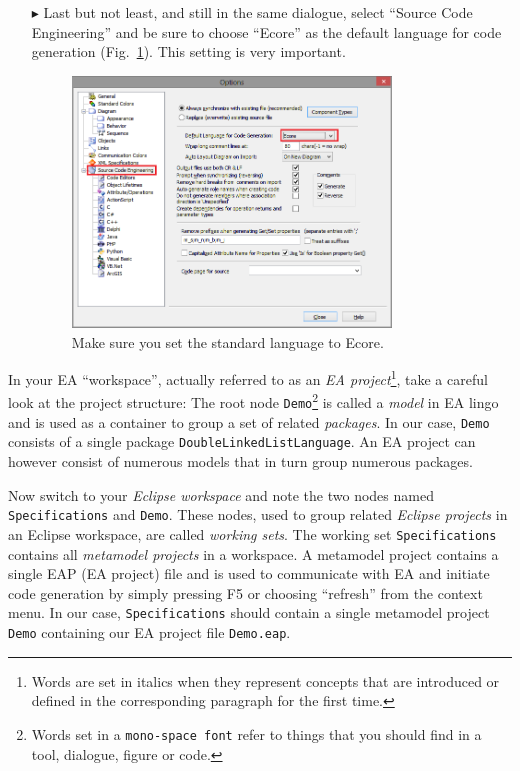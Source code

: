 \begin{itemize}
\item[$\blacktriangleright$] Last but not least, and still in the same dialogue, select ``Source Code Engineering'' and be sure to choose ``Ecore'' as the default language for code generation (Fig.~\ref{fig_standardSCEEA}). 
This setting is very important.
\begin{figure}
  \centering
  \includegraphics[width=0.8\textwidth]{../installation_images/standardCodeEngineering}
  \caption{Make sure you set the standard language to Ecore.}
  \label{fig_standardSCEEA}
\end{figure}
\end{itemize}

In your EA ``workspace'', actually referred to as an \emph{EA project}\footnote{Words are set in italics when they represent concepts that are introduced or defined  in the corresponding paragraph for the first time.}, take a careful  look at the project structure:  The root node \texttt{Demo}\footnote{Words set  in a \texttt{mono-space font} refer to things that you should find in a tool,  dialogue, figure or code.} is called a \emph{model} in EA lingo and is used as a  container to group a set of related \emph{packages}. 
In our case, \texttt{Demo}  consists of a single package \texttt{DoubleLinkedListLanguage}.
An EA project can however consist of numerous models that in turn group  numerous packages.

Now switch to your \emph{Eclipse workspace} and note the two nodes named \texttt{Spe\-ci\-fi\-ca\-tions} and \texttt{Demo}.  These nodes, used to group related \emph{Eclipse projects} in an Eclipse workspace, are called \emph{working sets}.
The working set \texttt{Spe\-ci\-fi\-ca\-tions} contains all \emph{metamodel projects} in a  workspace.
A metamodel project contains a single EAP (EA project) file and is used to communicate with EA and initiate code generation by simply pressing F5 or choosing ``refresh'' from the context menu.
In our case, \texttt{Specifications} should contain a single metamodel project \texttt{Demo} containing our EA project file  \texttt{Demo.eap}.

